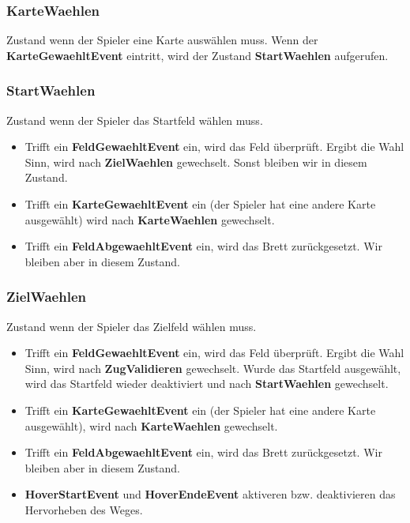 \documentclass[12pt,halfparskip]{scrartcl}
\begin{document}
\subsubsection{KarteWaehlen}
\label{ssub:kartewaehlen}
Zustand wenn der Spieler eine Karte auswählen muss. Wenn der \textbf{KarteGewaehltEvent} eintritt, wird der Zustand \textbf{StartWaehlen} aufgerufen.

\subsubsection{StartWaehlen}
\label{ssub:startwaehlen}
Zustand wenn der Spieler das Startfeld wählen muss.
\begin{itemize}
	\item Trifft ein \textbf{FeldGewaehltEvent} ein, wird das Feld überprüft. Ergibt die Wahl Sinn, wird nach \textbf{ZielWaehlen} gewechselt. Sonst bleiben wir in diesem Zustand.
	\item Trifft ein \textbf{KarteGewaehltEvent} ein (der Spieler hat eine andere Karte ausgewählt) wird nach \textbf{KarteWaehlen} gewechselt.
	\item Trifft ein \textbf{FeldAbgewaehltEvent} ein, wird das Brett zurückgesetzt. Wir bleiben aber in diesem Zustand.
\end{itemize}

\subsubsection{ZielWaehlen}
\label{ssub:zielwaehlen}
Zustand wenn der Spieler das Zielfeld wählen muss.
\begin{itemize}
	\item Trifft ein \textbf{FeldGewaehltEvent} ein, wird das Feld überprüft. Ergibt die Wahl Sinn, wird nach \textbf{ZugValidieren} gewechselt. Wurde das Startfeld ausgewählt, wird das Startfeld wieder deaktiviert und nach \textbf{StartWaehlen} gewechselt.
	\item Trifft ein \textbf{KarteGewaehltEvent} ein (der Spieler hat eine andere Karte ausgewählt), wird nach \textbf{KarteWaehlen} gewechselt.
	\item Trifft ein \textbf{FeldAbgewaehltEvent} ein, wird das Brett zurückgesetzt. Wir bleiben aber in diesem Zustand.
	\item \textbf{HoverStartEvent} und \textbf{HoverEndeEvent} aktiveren bzw. deaktivieren das Hervorheben des Weges.
\end{itemize}
\end{document}
